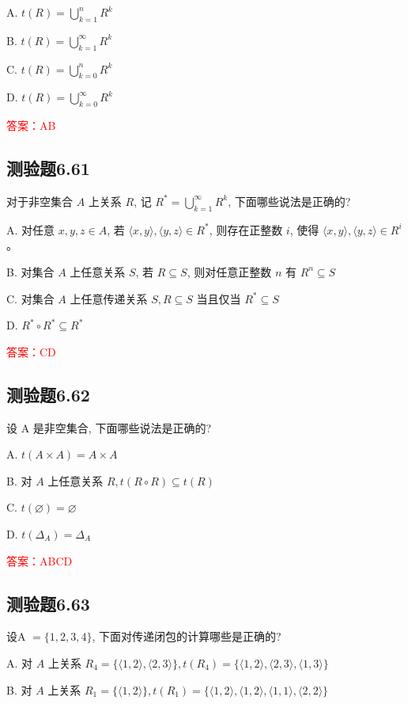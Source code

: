 \documentclass[UTF8, heading=true]{ctexart}
\begin{document}
A. $t(R)=\bigcup_{k=1}^n R^k$

B. $t(R)=\bigcup_{k=1}^{\infty} R^k$

C. $t(R)=\bigcup_{k=0}^n R^k$

D. $t(R)=\bigcup_{k=0}^{\infty} R^k$

\textcolor{red}{答案：AB}

\subsection{测验题6.61}
对于非空集合 $A$ 上关系 $R$, 记 $R^*=\bigcup_{k=1}^{\infty} R^k$, 下面哪些说法是正确的?

A. 对任意 $x, y, z \in A$, 若 $\langle x, y\rangle,\langle y, z\rangle \in R^*$, 则存在正整数 $i$, 使得 $\langle x, y\rangle,\langle y, z\rangle \in R^i$ 。

B. 对集合 $A$ 上任意关系 $S$, 若 $R \subseteq S$, 则对任意正整数 $n$ 有 $R^n \subseteq S$

C. 对集合 $A$ 上任意传递关系 $S, R \subseteq S$ 当且仅当 $R^* \subseteq S$

D. $R^* \circ R^* \subseteq R^*$

\textcolor{red}{答案：CD}


\subsection{测验题6.62}
设 A 是非空集合, 下面哪些说法是正确的?

A. $t(A \times A)=A \times A$

B. 对 $A$ 上任意关系 $R, t(R \circ R) \subseteq t(R)$

C. $t(\varnothing)=\varnothing$

D. $t\left(\Delta_A\right)=\Delta_A$

\textcolor{red}{答案：ABCD}

\subsection{测验题6.63}

设A $=\{1,2,3,4\}$, 下面对传递闭包的计算哪些是正确的?

A. 对 $A$ 上关系 $R_4=\{\langle 1,2\rangle,\langle 2,3\rangle\}, t\left(R_4\right)=\{\langle 1,2\rangle,\langle 2,3\rangle,\langle 1,3\rangle\}$

B. 对 $A$ 上关系 $R_1=\{\langle 1,2\rangle\}, t\left(R_1\right)=\{\langle 1,2\rangle,\langle 1,2\rangle,\langle 1,1\rangle,\langle 2,2\rangle\}$
\end{document}
